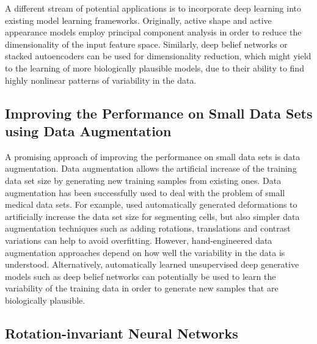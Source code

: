 A different stream of potential applications is to incorporate deep learning
into existing model learning frameworks. Originally, active shape
\citep{cootes1995} and active appearance \citep{cootes2001} models employ
principal component analysis in order to reduce the dimensionality of the input
feature space. Similarly, deep belief networks or stacked autoencoders can be
used for dimensionality reduction, which might yield to the learning of more
biologically plausible models, due to their ability to find highly nonlinear
patterns of variability in the data.

\subsection[Improving the performance on small data sets using data
augmentation]{Improving the Performance on Small Data Sets using Data
Augmentation}

A promising approach of improving the performance on small data sets is data
augmentation. Data augmentation allows the artificial increase of the training
data set size by generating new training samples from existing ones. Data
augmentation has been successfully used to deal with the problem of small
medical data sets. For example, \citet{ronneberger2015} used automatically
generated deformations to artificially increase the data set size for segmenting
cells, but also simpler data augmentation techniques such as adding rotations,
translations and contrast variations can help to avoid overfitting. However,
hand-engineered data augmentation approaches depend on how well the variability
in the data is understood. Alternatively, automatically learned unsupervised
deep generative models such as deep belief networks can potentially be used to
learn the variability of the training data in order to generate new samples that
are biologically plausible.

\subsection[Rotation-invariant neural networks]{Rotation-invariant Neural
Networks}


